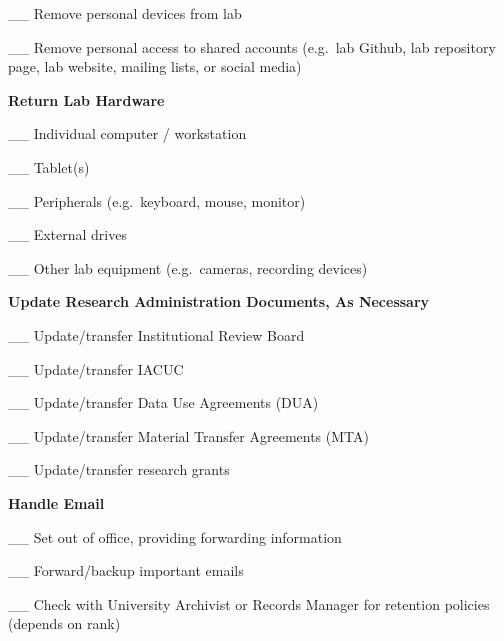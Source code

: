 \documentclass[
]{book}
\begin{document}
\_\_ Remove personal devices from lab

\_\_ Remove personal access to shared accounts (e.g.~lab Github, lab repository page, lab website, mailing lists, or social media)

\textbf{Return Lab Hardware}

\_\_ Individual computer / workstation

\_\_ Tablet(s)

\_\_ Peripherals (e.g.~keyboard, mouse, monitor)

\_\_ External drives

\_\_ Other lab equipment (e.g.~cameras, recording devices)

\textbf{Update Research Administration Documents, As Necessary}

\_\_ Update/transfer Institutional Review Board

\_\_ Update/transfer IACUC

\_\_ Update/transfer Data Use Agreements (DUA)

\_\_ Update/transfer Material Transfer Agreements (MTA)

\_\_ Update/transfer research grants

\textbf{Handle Email}

\_\_ Set out of office, providing forwarding information

\_\_ Forward/backup important emails

\_\_ Check with University Archivist or Records Manager for retention policies (depends on rank)

  
\end{document}
